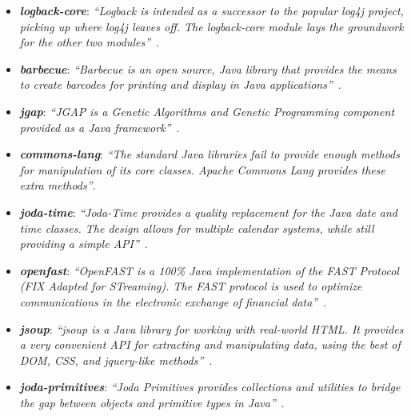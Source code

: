 \begin{itemize}
  \item \textbf{\emph{logback-core}}: \emph{``Logback is intended as a successor to the popular log4j project, picking up where log4j leaves off. The logback-core module lays the groundwork for the other two modules''}~\cite{logback}.
  \item \textbf{\emph{barbecue}}: \emph{``Barbecue is an open source, Java library that provides the means to create barcodes for printing and display in Java applications''}~\cite{barbecue}.
  \item \textbf{\emph{jgap}}: \emph{``JGAP is a Genetic Algorithms and Genetic Programming component provided as a Java framework''}~\cite{jgap}.
  \item \textbf{\emph{commons-lang}}: \emph{``The standard Java libraries fail to provide enough methods for manipulation of its core classes. Apache Commons Lang provides these extra methods''}\cite{commons-lang}.
  \item \textbf{\emph{joda-time}}: \emph{``Joda-Time provides a quality replacement for the Java date and time classes. The design allows for multiple calendar systems, while still providing a simple API''}~\cite{joda-time}.
  \item \textbf{\emph{openfast}}: \emph{``OpenFAST is a 100\% Java implementation of the FAST Protocol (FIX Adapted for STreaming). The FAST protocol is used to optimize communications in the electronic exchange of financial data''}~\cite{openfast}.
  \item \textbf{\emph{jsoup}}: \emph{``jsoup is a Java library for working with real-world HTML. It provides a very convenient API for extracting and manipulating data, using the best of DOM, CSS, and jquery-like methods''}~\cite{jsoup}.
  \item \textbf{\emph{joda-primitives}}: \emph{``Joda Primitives provides collections and utilities to bridge the gap between objects and primitive types in Java''}~\cite{joda-primitives}.
\end{itemize}

